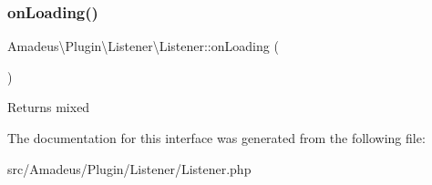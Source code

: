 \subsubsection{\texorpdfstring{on\+Loading()}{onLoading()}}
{\footnotesize\ttfamily Amadeus\textbackslash{}\+Plugin\textbackslash{}\+Listener\textbackslash{}\+Listener\+::on\+Loading (\begin{DoxyParamCaption}{ }\end{DoxyParamCaption})}

\begin{DoxyReturn}{Returns}
mixed 
\end{DoxyReturn}


The documentation for this interface was generated from the following file\+:\begin{DoxyCompactItemize}
\item 
src/\+Amadeus/\+Plugin/\+Listener/Listener.\+php\end{DoxyCompactItemize}
